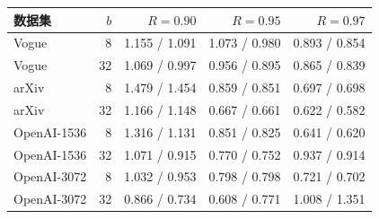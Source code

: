 \begin{tabular}{@{}lrrrr@{}}
\toprule
数据集 & $b$ & $R=0.90$ & $R=0.95$ & $R=0.97$ \\
\midrule
Vogue & 8 & 1.155 / 1.091 & 1.073 / 0.980 & 0.893 / 0.854 \\
Vogue & 32 & 1.069 / 0.997 & 0.956 / 0.895 & 0.865 / 0.839 \\
arXiv & 8 & 1.479 / 1.454 & 0.859 / 0.851 & 0.697 / 0.698 \\
arXiv & 32 & 1.166 / 1.148 & 0.667 / 0.661 & 0.622 / 0.582 \\
OpenAI-1536 & 8 & 1.316 / 1.131 & 0.851 / 0.825 & 0.641 / 0.620 \\
OpenAI-1536 & 32 & 1.071 / 0.915 & 0.770 / 0.752 & 0.937 / 0.914 \\
OpenAI-3072 & 8 & 1.032 / 0.953 & 0.798 / 0.798 & 0.721 / 0.702 \\
OpenAI-3072 & 32 & 0.866 / 0.734 & 0.608 / 0.771 & 1.008 / 1.351 \\
\bottomrule
\end{tabular}
